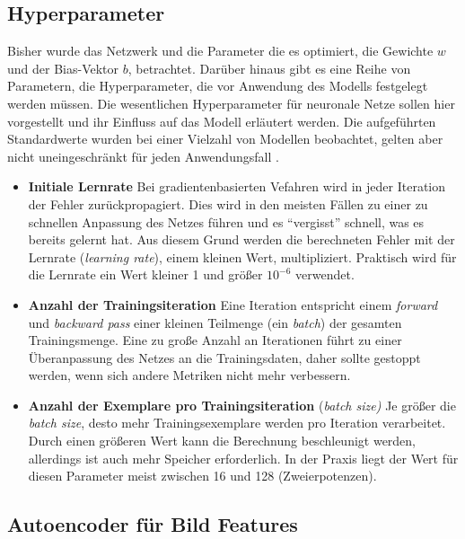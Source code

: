 \subsection{Hyperparameter}

Bisher wurde das Netzwerk und die Parameter die es optimiert, die Gewichte $w$ und der Bias-Vektor $b$, betrachtet. Darüber hinaus gibt es eine Reihe von Parametern, die Hyperparameter, die vor Anwendung des Modells festgelegt werden müssen. Die wesentlichen Hyperparameter für neuronale Netze sollen hier vorgestellt und ihr Einfluss auf das Modell erläutert werden. Die aufgeführten Standardwerte wurden bei einer Vielzahl von Modellen beobachtet, gelten aber nicht uneingeschränkt für jeden Anwendungsfall \cite{pda2012}. 

\begin{itemize}
	\item \textbf{Initiale Lernrate} Bei gradientenbasierten Vefahren wird in jeder Iteration der Fehler zurückpropagiert. Dies wird in den meisten Fällen zu einer zu schnellen Anpassung des Netzes führen und es \enquote{vergisst} schnell, was es bereits gelernt hat. Aus diesem Grund werden die berechneten Fehler mit der Lernrate (\textit{learning rate}), einem kleinen Wert, multipliziert. Praktisch wird für die Lernrate ein Wert kleiner 1 und größer $10^{-6}$ verwendet.
	\item \textbf{Anzahl der Trainingsiteration} Eine Iteration entspricht einem \textit{forward} und \textit{backward pass} einer kleinen Teilmenge (ein \textit{batch}) der gesamten Trainingsmenge. Eine zu große Anzahl an Iterationen führt zu einer Überanpassung des Netzes an die Trainingsdaten, daher sollte gestoppt werden, wenn sich andere Metriken nicht mehr verbessern.
	\item \textbf{Anzahl der Exemplare pro Trainingsiteration} (\textit{batch size)} Je größer die \textit{batch size}, desto mehr Trainingsexemplare werden pro Iteration verarbeitet. Durch einen größeren Wert kann die Berechnung beschleunigt werden, allerdings ist auch mehr Speicher erforderlich. In der Praxis liegt der Wert für diesen Parameter meist zwischen 16 und 128 (Zweierpotenzen). 
\end{itemize}

\subsection{Autoencoder für Bild Features}
\label{AEFeatures}

